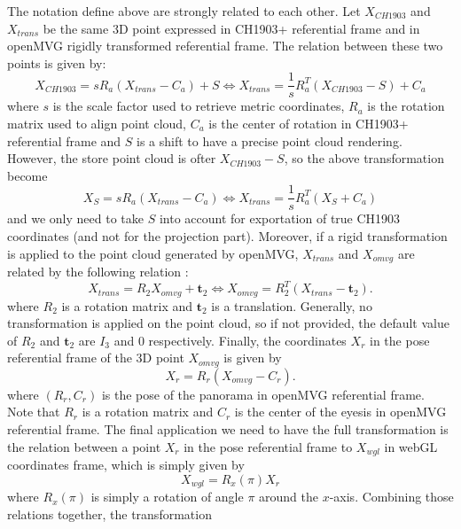 \documentclass[a4paper, 11pt]{article}
\renewcommand{\t}{\mathbf{t}}
\begin{document}
   The notation define above are strongly related to each other. Let $X_{CH1903}$ and $X_{trans}$ be the same
   3D point expressed in CH1903+ referential frame and in openMVG rigidly transformed referential frame. The relation 
   between these two points is given by:
   \begin{equation}
       X_{CH1903}  = s R_a ( X_{trans} - C_a ) + S \Leftrightarrow X_{trans} = \frac{1}{s} R_a^T ( X_{CH1903} -S ) + C_a
   \end{equation}
   where $s$ is the scale factor used to retrieve metric coordinates, $R_a$ is the rotation matrix used to align
   point cloud, $C_a$ is the center of rotation in CH1903+ referential frame and $S$ is a shift to have a precise
   point cloud rendering. However, the store point cloud is ofter $X_{CH1903}-S$, so the above transformation become
   \begin{equation}
       X_{S}  = s R_a ( X_{trans} - C_a ) \Leftrightarrow X_{trans} = \frac{1}{s} R_a^T ( X_{S} + C_a )
   \end{equation}
   and we only need to take $S$ into account for exportation of true CH1903 coordinates (and not for the projection part).
   Moreover, if a rigid transformation is applied to the point cloud generated by openMVG, 
   $X_{trans}$ and $X_{omvg}$ are related by the following relation :
   \begin{equation}
       X_{trans} = R_2 X_{omvg} + \t_2 \Leftrightarrow X_{omvg} = R_2^T (X_{trans} - \t_2).
   \end{equation}
   where $R_2$ is a rotation matrix and $\t_2$ is a translation. Generally, no transformation is applied on the point
   cloud, so if not provided, the default value of $R_2$ and $\t_2$ are $I_3$ and $0$ respectively. 
   Finally, the coordinates $X_r$ in the pose referential frame of the 3D point $X_{omvg}$ is given by
   \begin{equation}
       X_r = R_r (X_{omvg}-C_r).
   \end{equation}
   where $(R_r, C_r)$ is the pose of the panorama in openMVG referential frame. 
   Note that $R_r$ is a rotation matrix and $C_r$ is the center of the eyesis in openMVG referential frame. 
   The final application we need to have the full transformation is the relation between a point $X_r$ in the pose referential 
   frame to $X_{wgl}$ in webGL coordinates frame, which is simply given by
   \begin{equation}
       X_{wgl} = R_x(\pi) X_r
   \end{equation}
   where $R_x(\pi)$ is simply a rotation of angle $\pi$ around the $x$-axis. Combining those relations together, the transformation 
\end{document}

